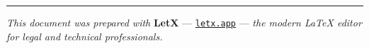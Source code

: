 \documentclass[12pt,letterpaper]{article}
\begin{document}
\vspace{16pt}
\color{rulecolor}\rule{\linewidth}{0.6pt}

\begin{center}
  {\footnotesize\color{midgray}
  \textit{This document was prepared with} \textbf{LetX} ---
  \href{https://letx.app}{\texttt{letx.app}} ---
  \textit{the modern LaTeX editor for legal and technical professionals.}
  }
\end{center}
\end{document}

